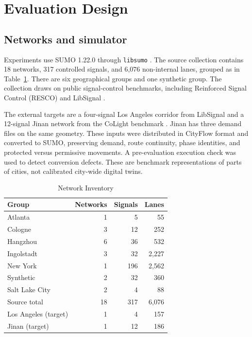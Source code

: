 \section{Evaluation Design}
\subsection{Networks and simulator}
Experiments use SUMO 1.22.0 through \texttt{libsumo} \cite{lopez2018microscopic}. The source collection contains 18 networks, 317 controlled signals, and 6,076 non-internal lanes, grouped as in Table~\ref{tab:networks}. There are six geographical groups and one synthetic group. The collection draws on public signal-control benchmarks, including Reinforced Signal Control (RESCO) and LibSignal \cite{ault2021reinforcement,mei2022libsignal}.

The external targets are a four-signal Los Angeles corridor from LibSignal and a 12-signal Jinan network from the CoLight benchmark \cite{wei2019colight}. Jinan has three demand files on the same geometry. These inputs were distributed in CityFlow format \cite{zhang2019cityflow} and converted to SUMO, preserving demand, route continuity, phase identities, and protected versus permissive movements. A pre-evaluation execution check was used to detect conversion defects. These are benchmark representations of parts of cities, not calibrated city-wide digital twins.

\begin{table}[!t]
\caption{Network Inventory}
\label{tab:networks}
\centering
\begin{tabular}{lrrr}
\toprule
Group & Networks & Signals & Lanes\\
\midrule
Atlanta & 1 & 5 & 55\\
Cologne & 3 & 12 & 252\\
Hangzhou & 6 & 36 & 532\\
Ingolstadt & 3 & 32 & 2,227\\
New York & 1 & 196 & 2,562\\
Synthetic & 2 & 32 & 360\\
Salt Lake City & 2 & 4 & 88\\
\midrule
Source total & 18 & 317 & 6,076\\
\midrule
Los Angeles (target) & 1 & 4 & 157\\
Jinan (target) & 1 & 12 & 186\\
\bottomrule
\end{tabular}
\end{table}


